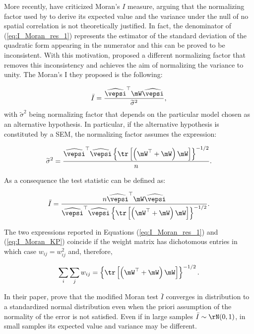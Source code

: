 \documentclass[english,12pt]{book}\usepackage[]{graphicx}\usepackage[]{xcolor}
\begin{document}
More recently, \cite{kelejian2001asymptotic} have criticized Moran's $I$  measure, arguing that the normalizing factor used by \cite{cliff1972testing} to derive its expected value and the variance under the null of no spatial correlation is not theoretically justified. In fact, the denominator of  (\ref{eq:I_Moran_res_1}) represents the estimator of the standard deviation of the quadratic form appearing in the numerator and this can be proved to be inconsistent. With this motivation, \cite{kelejian2001asymptotic} proposed a different normalizing factor that removes this inconsistency and achieves the aim of normalizing the variance to unity. The Moran's I they proposed is the following:

\begin{equation}
  \bar{I} = \frac{\widehat{\vepsi}^\top\mW\widehat{\vepsi}}{\widetilde{\sigma}^2},
\end{equation}
%
with $\widetilde{\sigma}^2$ being normalizing factor that depends on the particular model chosen as an alternative hypothesis. In particular, if the alternative hypothesis is constituted by a SEM, the normalizing factor assumes the expression:

\begin{equation}
  \widetilde{\sigma}^2 = \frac{\widehat{\vepsi}^\top\widehat{\vepsi}\left\lbrace \tr \left[\left(\mW^\top + \mW\right)\mW\right]\right\rbrace^{-1/2}}{n}.
\end{equation}

As a consequence the test statistic can be defined as:

\begin{equation}\label{eq:I_Moran_KP}
  \bar{I}= \frac{n\widehat{\vepsi}^\top\mW\widehat{\vepsi}}{\widehat{\vepsi}^\top\widehat{\vepsi}\left\lbrace \tr \left[\left(\mW^\top + \mW\right)\mW\right]\right\rbrace^{-1/2}}.
\end{equation}

The two expressions reported in Equations (\ref{eq:I_Moran_res_1}) and (\ref{eq:I_Moran_KP}) coincide if the weight matrix has dichotomous entries in which case $w_{ij} = w_{ij}^2$ and, therefore, 

\begin{equation*}
  \sum_i\sum_j w_{ij} = \left\lbrace \tr \left[\left(\mW^\top + \mW\right)\mW\right]\right\rbrace^{-1/2}.
\end{equation*}

In their paper,  \cite{kelejian2001asymptotic} prove that the modified Moran test $\bar{I}$ converges in distribution to a standardized normal distribution even when the priori assumption of the normality of the error is not satisfied. Even if in large samples $\bar{I}\sim \rN(0, 1)$, in small samples its expected value and variance may be different. 
\end{document}
